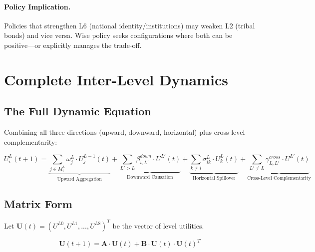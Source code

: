 \paragraph{Policy Implication.}
Policies that strengthen L6 (national identity/institutions) may weaken L2
(tribal bonds) and vice versa. Wise policy seeks configurations where both
can be positive---or explicitly manages the trade-off.

\section{Complete Inter-Level Dynamics}
\label{sec:aaa-complete-dynamics}

\subsection{The Full Dynamic Equation}

Combining all three directions (upward, downward, horizontal) plus cross-level
complementarity:

\begin{tcolorbox}[colback=green!5!white, colframe=green!50!black, title=Complete Inter-Level Utility Dynamics]
\begin{equation}
\boxed{
U^L_i(t+1) = \underbrace{\sum_{j \in M^L_i} \omega^L_j \cdot U^{L-1}_j(t)}_{\text{Upward Aggregation}}
+ \underbrace{\sum_{L' > L} \beta^{down}_{i,L'} \cdot U^{L'}(t)}_{\text{Downward Causation}}
+ \underbrace{\sum_{k \neq i} \sigma^L_{ik} \cdot U^L_k(t)}_{\text{Horizontal Spillover}}
+ \underbrace{\sum_{L' \neq L} \gamma^{cross}_{L,L'} \cdot U^{L'}(t)}_{\text{Cross-Level Complementarity}}
}
\label{eq:aaa-complete-dynamics}
\end{equation}
\end{tcolorbox}

\subsection{Matrix Form}

Let $\mathbf{U}(t) = (U^{L0}, U^{L1}, ..., U^{L8})^T$ be the vector of level utilities.

\begin{equation}
\mathbf{U}(t+1) = \mathbf{A} \cdot \mathbf{U}(t) + \mathbf{B} \cdot \mathbf{U}(t) \cdot \mathbf{U}(t)^T
\end{equation}

